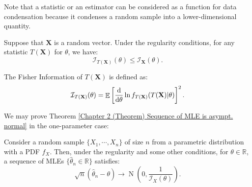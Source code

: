 \documentclass{huhtakm-template-book-v2}
\DeclareMathOperator{\E}{\mathbb{E}}
\DeclareMathOperator{\N}{N}
\begin{document}
    Note that a statistic or an estimator can be considered as a function for data condensation because it condenses a random sample into a lower-dimensional quantity.
    \begin{lem}
        Suppose that $\mathbf{X}$ is a random vector. Under the regularity conditions, for any statistic $T(\mathbf{X})$ for $\theta$, we have:
        \begin{equation*}
            \mathcal{I}_{T(\mathbf{X})}(\theta) \leq \mathcal{I}_{\mathbf{X}}(\theta).
        \end{equation*}
    \end{lem}
    \begin{rem}
        The Fisher Information of $T(\mathbf{X})$ is defined as:
        \begin{equation*}
            \mathcal{I}_{T(\mathbf{X})}(\theta) = \E\left[\odv*{}{\theta} \ln{f_{T(\mathbf{X})}(T(\mathbf{X}) | \theta)}\right]^{2}.
        \end{equation*}
    \end{rem}
    We may prove Theorem \ref{Chapter 2 (Theorem) Sequence of MLE is asympt. normal} in the one-parameter case:
    \begin{thm}
        Consider a random sample $\{X_{1}, \cdots, X_{n}\}$ of size $n$ from a parametric distribution with a PDF $f_{X}$. Then, under the regularity and some other conditions, for $\theta \in \mathbb{R}$, a sequence of MLEs $\{\hat{\theta}_{n} \in \mathbb{R}\}$ satisfies:
        \begin{equation*}
            \sqrt{n}(\hat{\theta}_{n} - \theta) \to \N\left(0, \frac{1}{\mathcal{I}_{X}(\theta)}\right).
        \end{equation*}
    \end{thm}
\end{document}
